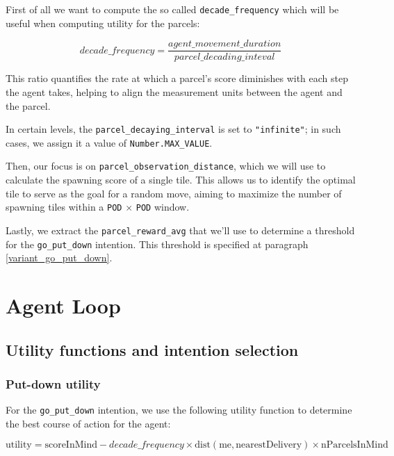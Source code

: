 \documentclass[12pt]{article}
\begin{document}
First of all we want to compute the so called \texttt{decade\_frequency} which will be useful when computing utility for the parcels: 

\begin{equation}
    decade\_frequency = \frac{agent\_movement\_duration}{parcel\_decading\_inteval}
\end{equation}

This ratio quantifies the rate at which a parcel's score diminishes with each step the agent takes, helping to align the measurement units between the agent and the parcel.

In certain levels, the \texttt{parcel\_decaying\_interval} is set to \texttt{"infinite"}; in such cases, we assign it a value of \texttt{Number.MAX\_VALUE}.

Then, our focus is on \texttt{parcel\_observation\_distance}, which we will use to calculate the spawning score of a single tile. This allows us to identify the optimal tile to serve as the goal for a random move, aiming to maximize the number of spawning tiles within a \texttt{POD} $\times$ \texttt{POD} window.

Lastly, we extract the \texttt{parcel\_reward\_avg} that we'll use to determine a threshold for the \texttt{go\_put\_down} intention. This threshold is specified at paragraph \ref{variant_go_put_down}.

\section{Agent Loop}

\subsection{Utility functions and intention selection}

\subsubsection{Put-down utility}

For the \texttt{go\_put\_down} intention, we use the following utility function to determine the best course of action for the agent:

\begin{equation}
    \text{utility} = \text{scoreInMind} - decade\_frequency \times \text{dist}(\text{me}, \text{nearestDelivery}) \times \text{nParcelsInMind}
\end{equation}
\end{document}
